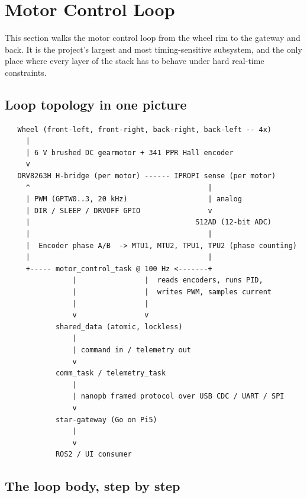 
\section{Motor Control Loop}
\label{section:motor-control-loop}

This section walks the motor control loop from the wheel rim to the
gateway and back. It is the project's largest and most timing-sensitive
subsystem, and the only place where every layer of the stack has to
behave under hard real-time constraints.

\subsection{Loop topology in one picture}

\begin{center}
\begin{verbatim}
   Wheel (front-left, front-right, back-right, back-left -- 4x)
     |
     | 6 V brushed DC gearmotor + 341 PPR Hall encoder
     v
   DRV8263H H-bridge (per motor) ------ IPROPI sense (per motor)
     ^                                          |
     | PWM (GPTW0..3, 20 kHz)                   | analog
     | DIR / SLEEP / DRVOFF GPIO                v
     |                                       S12AD (12-bit ADC)
     |                                          |
     |  Encoder phase A/B  -> MTU1, MTU2, TPU1, TPU2 (phase counting)
     |                                          |
     +----- motor_control_task @ 100 Hz <-------+
                |                |  reads encoders, runs PID,
                |                |  writes PWM, samples current
                |                |
                v                v
            shared_data (atomic, lockless)
                |
                | command in / telemetry out
                v
            comm_task / telemetry_task
                |
                | nanopb framed protocol over USB CDC / UART / SPI
                v
            star-gateway (Go on Pi5)
                |
                v
            ROS2 / UI consumer
\end{verbatim}
\end{center}

\subsection{The loop body, step by step}

